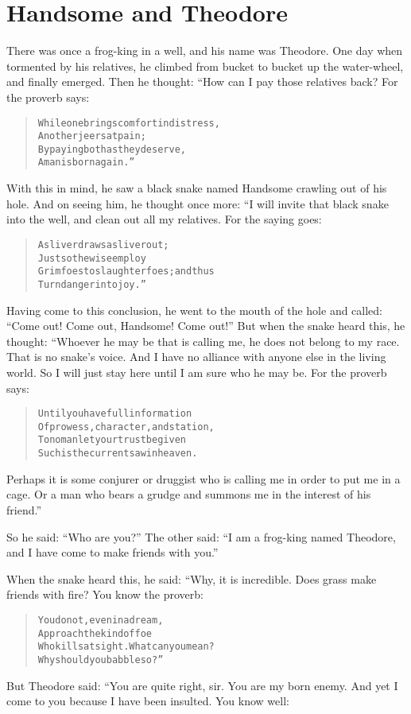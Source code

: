 \documentclass[article, twoside, 14pt]{memoir}
\renewenvironment{verbatim}{%
\begin{quote}%
\vskip -10pt%
\begin{alltt}\normalfont\large}{\end{alltt}%
\end{quote}%
\vskip -10pt
} %
\begin{document}
\chapter{Handsome and Theodore}

\label{s67}

There was once a frog-king in a well, and his name was Theodore.
One day when tormented by his relatives, he climbed from bucket to
bucket up the water-wheel, and finally emerged. Then he thought:
“How can I pay those relatives back? For the proverb says:

\begin{verbatim}
While one brings comfort in distress,
    Another jeers at pain;
By paying both as they deserve,
    A man is born again.”
\end{verbatim}
With this in mind, he saw a black snake named Handsome crawling out
of his hole. And on seeing him, he thought once more: “I will
invite that black snake into the well, and clean out all my
relatives. For the saying goes:

\begin{verbatim}
A sliver draws a sliver out;
    Just so the wise employ
Grim foes to slaughter foes; and thus
    Turn danger into joy.”
\end{verbatim}
Having come to this conclusion, he went to the mouth of the hole
and called: ``Come out! Come out, Handsome! Come out!'' But
when the snake heard this, he thought: “Whoever he may be that is
calling me, he does not belong to my race. That is no snake's
voice. And I have no alliance with anyone else in the living world.
So I will just stay here until I am sure who he may be. For the
proverb says:

\begin{verbatim}
Until you have full information
Of prowess, character, and station,
To no man let your trust be given{\textemdash}
Such is the current saw in heaven.
\end{verbatim}
Perhaps it is some conjurer or druggist who is calling me in order
to put me in a cage. Or a man who bears a grudge and summons me in
the interest of his friend.”

So he said: ``Who are you?'' The other said:
``I am a frog-king named Theodore, and I have come to make friends with you.''

When the snake heard this, he said: “Why, it is incredible. Does
grass make friends with fire? You know the proverb:

\begin{verbatim}
You do not, even in a dream,
    Approach the kind of foe
Who kills at sight. What can you mean?
    Why should you babble so?”
\end{verbatim}
But Theodore said: “You are quite right, sir. You are my born
enemy. And yet I come to you because I have been insulted. You know
well:
\end{document}
